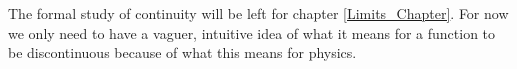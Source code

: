 \noindent The formal study of continuity will be left for chapter \ref{Limits_Chapter}. For now we only need to have a vaguer, intuitive idea of what it means for a function to be discontinuous because of what this means for physics. 


%

